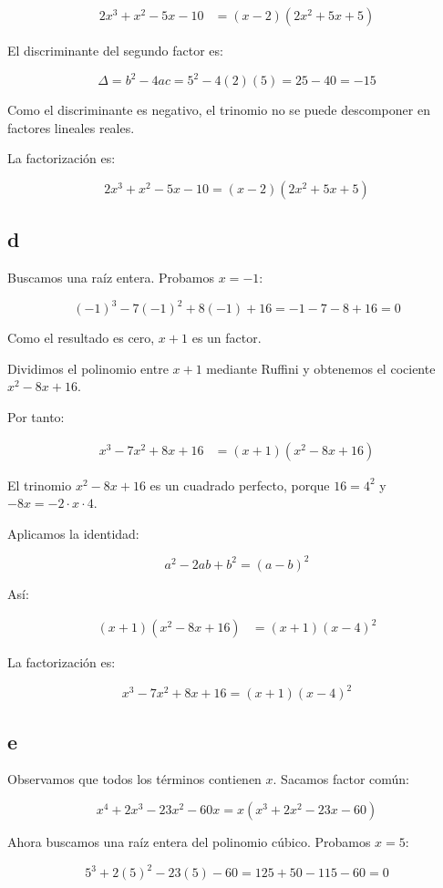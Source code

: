 \documentclass[a4paper,12pt]{article}
\begin{document}
\begin{align*}
2x^3+x^2-5x-10
&=(x-2)(2x^2+5x+5)
\end{align*}

El discriminante del segundo factor es:

\[
\Delta=b^2-4ac=5^2-4(2)(5)=25-40=-15
\]

Como el discriminante es negativo, el trinomio no se
puede descomponer en factores lineales reales.

La factorización es:

\[
\boxed{
2x^3+x^2-5x-10=(x-2)(2x^2+5x+5)
}
\]

\subsection*{d}
Buscamos una raíz entera. Probamos $x=-1$:

\[
(-1)^3-7(-1)^2+8(-1)+16
=-1-7-8+16=0
\]

Como el resultado es cero, $x+1$ es un factor.

Dividimos el polinomio entre $x+1$ mediante Ruffini
y obtenemos el cociente $x^2-8x+16$.

Por tanto:

\begin{align*}
x^3-7x^2+8x+16
&=(x+1)(x^2-8x+16)
\end{align*}

El trinomio $x^2-8x+16$ es un cuadrado perfecto,
porque $16=4^2$ y $-8x=-2\cdot x\cdot4$.

Aplicamos la identidad:

\[
a^2-2ab+b^2=(a-b)^2
\]

Así:

\begin{align*}
(x+1)(x^2-8x+16)
&=(x+1)(x-4)^2
\end{align*}

La factorización es:

\[
\boxed{
x^3-7x^2+8x+16=(x+1)(x-4)^2
}
\]

\subsection*{e}

Observamos que todos los términos contienen $x$.
Sacamos factor común:

\[
x^4+2x^3-23x^2-60x
=x(x^3+2x^2-23x-60)
\]

Ahora buscamos una raíz entera del polinomio cúbico.
Probamos $x=5$:

\[
5^3+2(5)^2-23(5)-60
=125+50-115-60=0
\]
\end{document}
